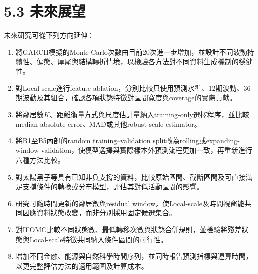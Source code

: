 \section*{5.3 未來展望}

未來研究可從下列方向延伸：
\begin{enumerate}
  \item 將GARCH模擬的Monte Carlo次數由目前20次進一步增加，並設計不同波動持續性、偏態、厚尾與結構轉折情境，以檢驗各方法對不同資料生成機制的穩健性。
  \item 對Local-scale進行feature ablation，分別比較只使用預測水準、12期波動、36期波動及其組合，確認各項狀態特徵對區間寬度與coverage的實際貢獻。
  \item 將鄰居數$K$、距離衡量方式與尺度估計量納入training-only選擇程序，並比較median absolute error、MAD或其他robust scale estimator。
  \item 將B1至B5內部的random training--validation split改為rolling或expanding-window validation，使模型選擇與實際樣本外預測流程更加一致，再重新進行六種方法比較。
  \item 對太陽黑子等具有已知非負支撐的資料，比較原始區間、截斷區間及可直接滿足支撐條件的轉換或分布模型，評估其對低活動區間的影響。
  \item 研究可隨時間更新的鄰居數與residual window，使Local-scale及時間視窗能共同因應資料狀態改變，而非分別採用固定候選集合。
  \item 對IFOMC比較不同狀態數、最低轉移次數與狀態合併規則，並檢驗將殘差狀態與Local-scale特徵共同納入條件區間的可行性。
  \item 增加不同金融、能源與自然科學時間序列，並同時報告預測指標與運算時間，以更完整評估方法的適用範圍及計算成本。
\end{enumerate}
